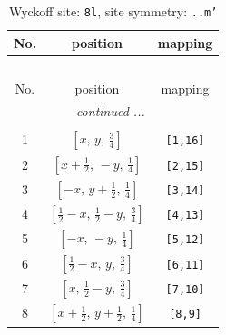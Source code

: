 \documentclass[fleqn,8pt]{jsarticle}
\begin{document}
\begin{longtable}{ccc}
\caption{Wyckoff site: {\tt 8l}, site symmetry: {\tt ..m'}}
 \\
 \hline \hline
No. & position & mapping \\ \hline \endfirsthead

\multicolumn{2}{l}{\tablename\ \thetable{}} \\
 \hline \hline
No. & position & mapping \\ \hline \endhead

 \hline \hline
\multicolumn{2}{r}{\footnotesize\it continued ...} \\ \endfoot

 \hline \hline
\multicolumn{2}{r}{} \\ \endlastfoot

1 & $\left[ x,\, y,\, \frac{3}{4} \right]$ & {\tt [1,16]} \\ \hline
2 & $\left[ x + \frac{1}{2},\, - y,\, \frac{1}{4} \right]$ & {\tt [2,15]} \\ \hline
3 & $\left[ - x,\, y + \frac{1}{2},\, \frac{1}{4} \right]$ & {\tt [3,14]} \\ \hline
4 & $\left[ \frac{1}{2} - x,\, \frac{1}{2} - y,\, \frac{3}{4} \right]$ & {\tt [4,13]} \\ \hline
5 & $\left[ - x,\, - y,\, \frac{1}{4} \right]$ & {\tt [5,12]} \\ \hline
6 & $\left[ \frac{1}{2} - x,\, y,\, \frac{3}{4} \right]$ & {\tt [6,11]} \\ \hline
7 & $\left[ x,\, \frac{1}{2} - y,\, \frac{3}{4} \right]$ & {\tt [7,10]} \\ \hline
8 & $\left[ x + \frac{1}{2},\, y + \frac{1}{2},\, \frac{1}{4} \right]$ & {\tt [8,9]} \\
\end{longtable}
\renewcommand{\arraystretch}{1.2}
\end{document}
